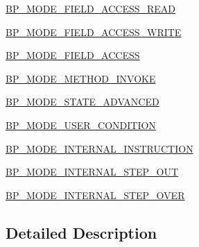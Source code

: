 \begin{DoxyCompactItemize}
\item 
\hyperlink{enumgov_1_1nasa_1_1jpf_1_1inspector_1_1server_1_1breakpoints_1_1_break_point_modes_ab6a4f07b54aa0a40c932b7975934e15f}{B\+P\+\_\+\+M\+O\+D\+E\+\_\+\+F\+I\+E\+L\+D\+\_\+\+A\+C\+C\+E\+S\+S\+\_\+\+R\+E\+AD}
\item 
\hyperlink{enumgov_1_1nasa_1_1jpf_1_1inspector_1_1server_1_1breakpoints_1_1_break_point_modes_a75406561044affb70b0380a391905253}{B\+P\+\_\+\+M\+O\+D\+E\+\_\+\+F\+I\+E\+L\+D\+\_\+\+A\+C\+C\+E\+S\+S\+\_\+\+W\+R\+I\+TE}
\item 
\hyperlink{enumgov_1_1nasa_1_1jpf_1_1inspector_1_1server_1_1breakpoints_1_1_break_point_modes_ae4e756a4d9098476882df84124266b8b}{B\+P\+\_\+\+M\+O\+D\+E\+\_\+\+F\+I\+E\+L\+D\+\_\+\+A\+C\+C\+E\+SS}
\item 
\hyperlink{enumgov_1_1nasa_1_1jpf_1_1inspector_1_1server_1_1breakpoints_1_1_break_point_modes_a98292ad1ea7da6e93af939b25fb26641}{B\+P\+\_\+\+M\+O\+D\+E\+\_\+\+M\+E\+T\+H\+O\+D\+\_\+\+I\+N\+V\+O\+KE}
\item 
\hyperlink{enumgov_1_1nasa_1_1jpf_1_1inspector_1_1server_1_1breakpoints_1_1_break_point_modes_aa9669abf0bf91b1232bd1697de739dee}{B\+P\+\_\+\+M\+O\+D\+E\+\_\+\+S\+T\+A\+T\+E\+\_\+\+A\+D\+V\+A\+N\+C\+ED}
\item 
\hyperlink{enumgov_1_1nasa_1_1jpf_1_1inspector_1_1server_1_1breakpoints_1_1_break_point_modes_a1a6b6b98e5e77a0d6647a86862118013}{B\+P\+\_\+\+M\+O\+D\+E\+\_\+\+U\+S\+E\+R\+\_\+\+C\+O\+N\+D\+I\+T\+I\+ON}
\item 
\hyperlink{enumgov_1_1nasa_1_1jpf_1_1inspector_1_1server_1_1breakpoints_1_1_break_point_modes_a66cadc84899feba064d4ffbb1d332ad2}{B\+P\+\_\+\+M\+O\+D\+E\+\_\+\+I\+N\+T\+E\+R\+N\+A\+L\+\_\+\+I\+N\+S\+T\+R\+U\+C\+T\+I\+ON}
\item 
\hyperlink{enumgov_1_1nasa_1_1jpf_1_1inspector_1_1server_1_1breakpoints_1_1_break_point_modes_a7bdb2d58dedb66ddca5b331a9816e678}{B\+P\+\_\+\+M\+O\+D\+E\+\_\+\+I\+N\+T\+E\+R\+N\+A\+L\+\_\+\+S\+T\+E\+P\+\_\+\+O\+UT}
\item 
\hyperlink{enumgov_1_1nasa_1_1jpf_1_1inspector_1_1server_1_1breakpoints_1_1_break_point_modes_a221dec896e115799d4d6be01e4e3b565}{B\+P\+\_\+\+M\+O\+D\+E\+\_\+\+I\+N\+T\+E\+R\+N\+A\+L\+\_\+\+S\+T\+E\+P\+\_\+\+O\+V\+ER}
\end{DoxyCompactItemize}


\subsection{Detailed Description}


